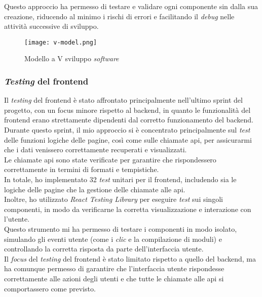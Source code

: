 \noindent Questo approccio ha permesso di testare e validare ogni componente sin dalla sua creazione, riducendo al minimo i rischi di errori e facilitando il \textit{debug} nelle attività successive di sviluppo.

\begin{figure}[H]
    \centering
    \texttt{[image: v-model.png]}
    \caption{Modello a V sviluppo \textit{software}}
    \label{fig:v-model}  
    \cite{site:v-model}
\end{figure}

\subsubsection{\textit{Testing} del \gls{frontend}}

Il \textit{testing} del \gls{frontend} è stato affrontato principalmente nell'ultimo \gls{sprint} del progetto, con un focus minore rispetto al \gls{backend}, in quanto le funzionalità del \gls{frontend} erano strettamente dipendenti dal corretto funzionamento del \gls{backend}.\\

\noindent Durante questo \gls{sprint}, il mio approccio si è concentrato principalmente sul \textit{test} delle funzioni logiche delle pagine, così come sulle chiamate \gls{api}, per assicurarmi che i dati venissero correttamente recuperati e visualizzati.\\
Le chiamate \gls{api} sono state verificate per garantire che rispondessero correttamente in termini di formati e tempistiche.\\

\noindent In totale, ho implementato 32 \textit{test} unitari per il \gls{frontend}, includendo sia le logiche delle pagine che la gestione delle chiamate alle \gls{api}.\\
Inoltre, ho utilizzato \textit{React Testing Library} per eseguire \textit{test} sui singoli componenti, in modo da verificarne la corretta visualizzazione e interazione con l'utente. \\
Questo strumento mi ha permesso di testare i componenti in modo isolato, simulando gli eventi utente (come i \textit{clic} e la compilazione di moduli) e controllando la corretta risposta da parte dell'interfaccia utente.\\

\noindent Il \textit{focus} del \textit{testing} del \gls{frontend} è stato limitato rispetto a quello del \gls{backend}, ma ha comunque permesso di garantire che l'interfaccia utente rispondesse correttamente alle azioni degli utenti e che tutte le chiamate alle \gls{api} si comportassero come previsto.


